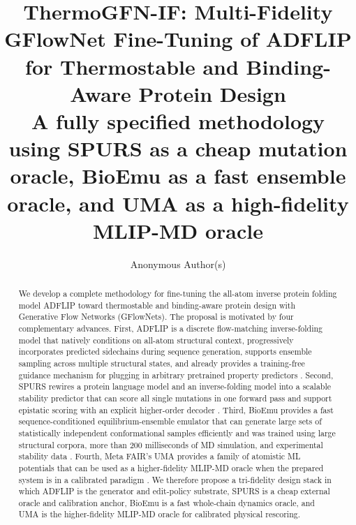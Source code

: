 \documentclass[11pt]{article}
\title{ThermoGFN-IF: Multi-Fidelity GFlowNet Fine-Tuning of ADFLIP for Thermostable and Binding-Aware Protein Design\\
\large A fully specified methodology using SPURS as a cheap mutation oracle, BioEmu as a fast ensemble oracle, and UMA as a high-fidelity MLIP-MD oracle}
\author{Anonymous Author(s)}
\date{}
\begin{document}
\maketitle




\begin{abstract}
We develop a complete methodology for fine-tuning the all-atom inverse protein folding model ADFLIP toward thermostable and binding-aware protein design with Generative Flow Networks (GFlowNets). The proposal is motivated by four complementary advances. First, ADFLIP is a discrete flow-matching inverse-folding model that natively conditions on all-atom structural context, progressively incorporates predicted sidechains during sequence generation, supports ensemble sampling across multiple structural states, and already provides a training-free guidance mechanism for plugging in arbitrary pretrained property predictors \citep{yi2025adflip,campbell2024flowmatchingdiscrete}. Second, SPURS rewires a protein language model and an inverse-folding model into a scalable stability predictor that can score all single mutations in one forward pass and support epistatic scoring with an explicit higher-order decoder \citep{li2026spurs}. Third, BioEmu provides a fast sequence-conditioned equilibrium-ensemble emulator that can generate large sets of statistically independent conformational samples efficiently and was trained using large structural corpora, more than 200 milliseconds of MD simulation, and experimental stability data \citep{lewis2024bioemu}. Fourth, Meta FAIR's UMA provides a family of atomistic ML potentials that can be used as a higher-fidelity MLIP-MD oracle when the prepared system is in a calibrated paradigm \citep{wood2025uma,levine2025omol25,fairchem2025github}. We therefore propose a tri-fidelity design stack in which ADFLIP is the generator and edit-policy substrate, SPURS is a cheap external oracle and calibration anchor, BioEmu is a fast whole-chain dynamics oracle, and UMA is the higher-fidelity MLIP-MD oracle for calibrated physical rescoring.


\end{abstract}
\end{document}
